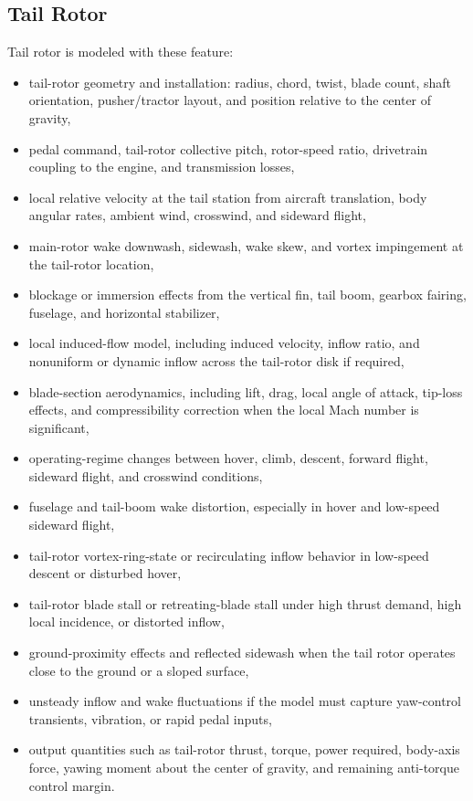 \documentclass[12pt,a4paper]{article}
\begin{document}
\subsection{Tail Rotor}
Tail rotor is modeled with these feature:
\begin{itemize}
  \item tail-rotor geometry and installation: radius, chord, twist, blade count, shaft orientation, pusher/tractor layout, and position relative to the center of gravity,
  \item pedal command, tail-rotor collective pitch, rotor-speed ratio, drivetrain coupling to the engine, and transmission losses,
  \item local relative velocity at the tail station from aircraft translation, body angular rates, ambient wind, crosswind, and sideward flight,
  \item main-rotor wake downwash, sidewash, wake skew, and vortex impingement at the tail-rotor location,
  \item blockage or immersion effects from the vertical fin, tail boom, gearbox fairing, fuselage, and horizontal stabilizer,
  \item local induced-flow model, including induced velocity, inflow ratio, and nonuniform or dynamic inflow across the tail-rotor disk if required,
  \item blade-section aerodynamics, including lift, drag, local angle of attack, tip-loss effects, and compressibility correction when the local Mach number is significant,
  \item operating-regime changes between hover, climb, descent, forward flight, sideward flight, and crosswind conditions,
  \item fuselage and tail-boom wake distortion, especially in hover and low-speed sideward flight,
  \item tail-rotor vortex-ring-state or recirculating inflow behavior in low-speed descent or disturbed hover,
  \item tail-rotor blade stall or retreating-blade stall under high thrust demand, high local incidence, or distorted inflow,
  \item ground-proximity effects and reflected sidewash when the tail rotor operates close to the ground or a sloped surface,
  \item unsteady inflow and wake fluctuations if the model must capture yaw-control transients, vibration, or rapid pedal inputs,
  \item output quantities such as tail-rotor thrust, torque, power required, body-axis force, yawing moment about the center of gravity, and remaining anti-torque control margin.
\end{itemize}
\end{document}
